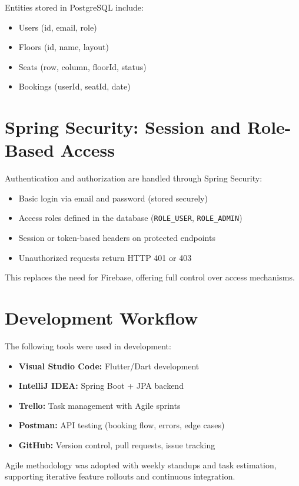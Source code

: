 \documentclass[12pt,a4paper]{report}
\begin{document}
Entities stored in PostgreSQL include:
\begin{itemize}
    \item Users (id, email, role)
    \item Floors (id, name, layout)
    \item Seats (row, column, floorId, status)
    \item Bookings (userId, seatId, date)
\end{itemize}

\section{Spring Security: Session and Role-Based Access}

Authentication and authorization are handled through Spring Security:
\begin{itemize}
    \item Basic login via email and password (stored securely)
    \item Access roles defined in the database (\verb|ROLE_USER|, \verb|ROLE_ADMIN|)
    \item Session or token-based headers on protected endpoints
    \item Unauthorized requests return HTTP 401 or 403
\end{itemize}

This replaces the need for Firebase, offering full control over access mechanisms.

\section{Development Workflow}

The following tools were used in development:
\begin{itemize}
    \item \textbf{Visual Studio Code:} Flutter/Dart development
    \item \textbf{IntelliJ IDEA:} Spring Boot + JPA backend
    \item \textbf{Trello:} Task management with Agile sprints
    \item \textbf{Postman:} API testing (booking flow, errors, edge cases)
    \item \textbf{GitHub:} Version control, pull requests, issue tracking
\end{itemize}

Agile methodology was adopted with weekly standups and task estimation, supporting iterative feature rollouts and continuous integration.
\end{document}
